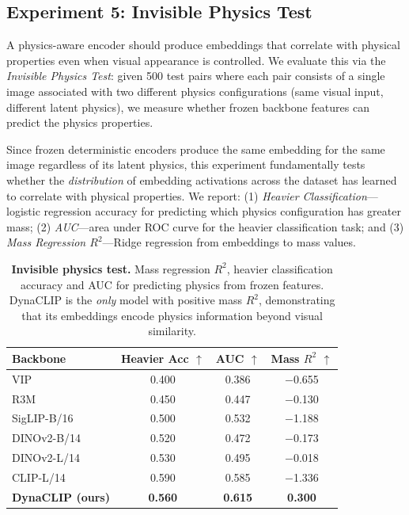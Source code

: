 \documentclass{article}
\newcommand{\methodname}{DynaCLIP}
\begin{document}
\subsection{Experiment 5: Invisible Physics Test}
\label{sec:exp5}

A physics-aware encoder should produce embeddings that correlate with physical properties even when visual appearance is controlled. We evaluate this via the \emph{Invisible Physics Test}: given 500 test pairs where each pair consists of a single image associated with two different physics configurations (same visual input, different latent physics), we measure whether frozen backbone features can predict the physics properties.

Since frozen deterministic encoders produce the same embedding for the same image regardless of its latent physics, this experiment fundamentally tests whether the \emph{distribution} of embedding activations across the dataset has learned to correlate with physical properties. We report: (1) \emph{Heavier Classification}---logistic regression accuracy for predicting which physics configuration has greater mass; (2) \emph{AUC}---area under ROC curve for the heavier classification task; and (3) \emph{Mass Regression $R^2$}---Ridge regression from embeddings to mass values.

\begin{table}[h]
\centering
\caption{\textbf{Invisible physics test.} Mass regression $R^2$, heavier classification accuracy and AUC for predicting physics from frozen features. \methodname{} is the \emph{only} model with positive mass $R^2$, demonstrating that its embeddings encode physics information beyond visual similarity.}
\label{tab:invisible_physics}
\begin{tabular}{lccc}
\toprule
\textbf{Backbone} & \textbf{Heavier Acc $\uparrow$} & \textbf{AUC $\uparrow$} & \textbf{Mass $R^2$ $\uparrow$} \\
\midrule
VIP~\cite{ma2022vip}             & 0.400 & 0.386 & $-$0.655 \\
R3M~\cite{nair2022r3m}             & 0.450 & 0.447 & $-$0.130 \\
SigLIP-B/16       & 0.500 & 0.532 & $-$1.188 \\
DINOv2-B/14       & 0.520 & 0.472 & $-$0.173 \\
DINOv2-L/14       & 0.530 & 0.495 & $-$0.018 \\
CLIP-L/14         & 0.590 & 0.585 & $-$1.336 \\
\midrule
\textbf{\methodname{} (ours)} & \textbf{0.560} & \textbf{0.615} & \textbf{0.300} \\
\bottomrule
\end{tabular}
\end{table}
\end{document}
